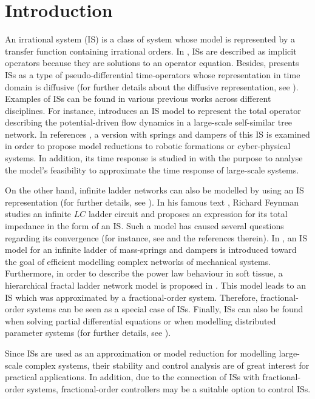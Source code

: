 \documentclass[twoside,reqno,11pt]{fcaa-var} %
\begin{document}
\section{Introduction}\label{sec:1}
An irrational system (IS) is a class of system whose model is represented by a transfer function containing irrational orders. In \cite{Sen2018,Mayes2011}, ISs are described as implicit operators because they are solutions to an operator equation. Besides,\cite{Montseny1998} presents ISs as a type of pseudo-differential time-operators whose representation in time domain is diffusive (for further details about the diffusive representation, see \cite{Casenave2010}). 
Examples of ISs can be found in various previous works across different disciplines. For instance, \cite{Mayes2011} introduces an IS model to represent the total operator describing the potential-driven flow dynamics in a large-scale self-similar tree network. In references \cite{Goodwine2018,Leyden2016}, a version with springs and dampers of this IS is examined in order to propose model reductions to robotic formations or cyber-physical systems. In addition, its time response is studied in \cite{Guel-Cortez2018b} with the purpose to analyse the model's feasibility to approximate the time response of large-scale systems. \par 
On the other hand, infinite ladder networks can also be modelled by using an IS representation (for further details, see \cite{Sen2018}). In his famous text \cite{Feynman2006}, Richard Feynman studies an infinite $LC$ ladder circuit and proposes an expression for its total impedance in the form of an IS. Such a model has caused several questions regarding its convergence (for instance, see \cite{Klimo_2016} and the references therein). In \cite{Leyden2018a}, an IS model for an infinite ladder of mass-springs and dampers is introduced toward the goal of efficient modelling complex networks of mechanical systems. Furthermore, in order to describe the power law behaviour in soft tissue, a hierarchical fractal ladder network model is proposed in \cite{Kelly2009}. This model leads to an IS which was approximated by a fractional-order system. Therefore, fractional-order systems can be seen as a special case of ISs. Finally, ISs can also be found when solving partial differential equations or when modelling distributed parameter systems (for further details, see \cite{Curtain1992,Curtain1995,Hernandez2013,Wu2007}). \par 
Since ISs are used as an approximation or model reduction for modelling large-scale complex systems, their stability and control analysis are of great interest for practical applications. In addition, due to the connection of ISs with fractional-order systems, fractional-order controllers may be a suitable option to control ISs. \par 
\end{document}

